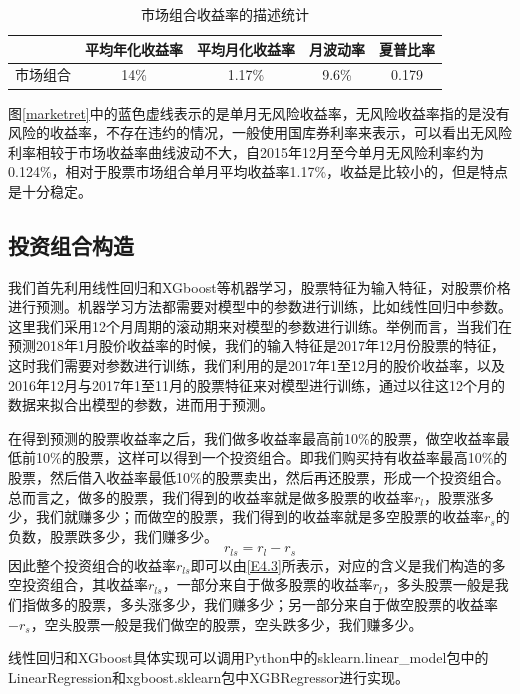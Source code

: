 \documentclass[12pt]{article} %
\begin{document}
	\begin{table}[ht]
		\centering
		\caption{市场组合收益率的描述统计}
		\begin{tabular}{ccccc}
			\hline
			& 平均年化收益率 & 平均月化收益率 & 月波动率  & 夏普比率  \\ \hline
			市场组合 & 14\%    & 1.17\%  & 9.6\% & 0.179 \\ \hline
		\end{tabular}
		\label{biao2}
	\end{table}
	
	图\ref{marketret}中的蓝色虚线表示的是单月无风险收益率，无风险收益率指的是没有风险的收益率，不存在违约的情况，一般使用国库券利率来表示，可以看出无风险利率相较于市场收益率曲线波动不大，自2015年12月至今单月无风险利率约为0.124\%，相对于股票市场组合单月平均收益率1.17\%，收益是比较小的，但是特点是十分稳定。
	
	\subsection{投资组合构造}
	我们首先利用线性回归和XGboost等机器学习，股票特征为输入特征，对股票价格进行预测。机器学习方法都需要对模型中的参数进行训练，比如线性回归中参数。这里我们采用12个月周期的滚动期来对模型的参数进行训练。举例而言，当我们在预测2018年1月股价收益率的时候，我们的输入特征是2017年12月份股票的特征，这时我们需要对参数进行训练，我们利用的是2017年1至12月的股价收益率，以及2016年12月与2017年1至11月的股票特征来对模型进行训练，通过以往这12个月的数据来拟合出模型的参数，进而用于预测。
	
	在得到预测的股票收益率之后，我们做多收益率最高前10\%的股票，做空收益率最低前10\%的股票，这样可以得到一个投资组合。即我们购买持有收益率最高10\%的股票，然后借入收益率最低10\%的股票卖出，然后再还股票，形成一个投资组合。总而言之，做多的股票，我们得到的收益率就是做多股票的收益率$r_l$，股票涨多少，我们就赚多少；而做空的股票，我们得到的收益率就是多空股票的收益率$r_s$的负数，股票跌多少，我们赚多少。
	\begin{equation}
		r_{ls}=r_l-r_s \label{E4.3}
	\end{equation}
	因此整个投资组合的收益率$r_{ls}$即可以由\eqref{E4.3}所表示，对应的含义是我们构造的多空投资组合，其收益率$r_{ls}$，一部分来自于做多股票的收益率$r_l$，多头股票一般是我们指做多的股票，多头涨多少，我们赚多少；另一部分来自于做空股票的收益率$-r_s$，空头股票一般是我们做空的股票，空头跌多少，我们赚多少。
	
	线性回归和XGboost具体实现可以调用Python中的sklearn.linear\_model包中的 LinearRegression和xgboost.sklearn包中XGBRegressor进行实现。
	
\end{document}

